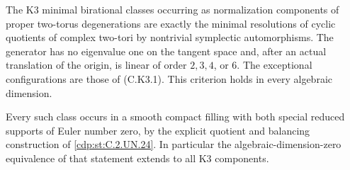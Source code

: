 
\begin{proposition}\label{cdp:st:C.2.UN.32}
The K3 minimal birational classes occurring as
normalization components of proper two-torus
degenerations are exactly the minimal resolutions
of cyclic quotients of complex two-tori by
nontrivial symplectic automorphisms.
The generator has no eigenvalue one on the tangent space
and, after an actual translation of the origin,
is linear of order $2,3,4$, or $6$.
The exceptional configurations are those of
(C.K3.1). This criterion holds in every
algebraic dimension.

Every such class occurs in a smooth compact
filling with both special reduced supports
of Euler number zero, by the explicit quotient
and balancing construction of \ref{cdp:st:C.2.UN.24}.
In particular the algebraic-dimension-zero
equivalence of that statement extends to
all K3 components.
\end{proposition}

